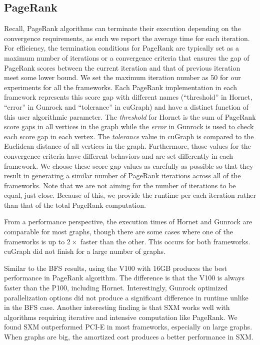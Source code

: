 \subsection{PageRank}
Recall, PageRank algorithms can terminate their execution depending on the convergence requirements, as such we report the average time for each iteration. 
For efficiency, the termination conditions for PageRank are typically set as a maximum number of iterations or a convergence criteria that ensures the gap of PageRank scores between the current iteration and that of previous iteration meet some lower bound. We set the maximum iteration number as 50 for our experiments for all the frameworks. 
Each PageRank implementation in each framework represents this score gap with different names (``threshold'' in Hornet, ``error'' in Gunrock and ``tolerance'' in cuGraph) and have a distinct function of this user algorithmic parameter. The \emph{threshold} for Hornet is the sum of PageRank score gaps in all vertices in the graph while the \emph{error} in Gunrock is used to check each score gap in each vertex. The \emph{tolerance} value in cuGraph is compared to the Euclidean distance of all vertices in the graph. 
Furthermore, those values for the convergence criteria have different behaviors and are set differently in each framework. %
We choose these score gap values as carefully as possible so that they result in generating a similar number of PageRank iterations across all of the frameworks. Note that we are not aiming for the number of iterations to be equal, just close. Because of this, we provide the runtime per each iteration rather than that of the total PageRank computation.

From a performance perspective, the execution times of Hornet and Gunrock are comparable for most graphs, though there are some cases where one of the frameworks is up to $2\times$ faster than the other. This occurs for both frameworks. cuGraph did not finish for a large number of graphs. 


Similar to the BFS results, using the V100 with 16GB produces the best performance in PageRank algorithm. The difference is that the V100 is always faster than the P100, including Hornet. Interestingly, Gunrock optimized parallelization options did not produce a significant difference in runtime unlike in the BFS case. Another interesting finding is that SXM works well with algorithms requiring iterative and intensive computation like PageRank. We found SXM outperformed PCI-E in most frameworks, especially on large graphs. When graphs are big, the amortized cost produces a better performance in SXM.

